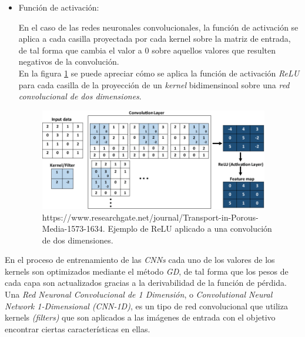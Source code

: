 \begin{itemize}
                    \item Función de activación:


                        En el caso de las redes neuronales convolucionales, la función de activación se aplica a cada casilla proyectada por cada kernel sobre la matriz de entrada, de tal forma que cambia el valor a $0$ sobre aquellos valores que resulten negativos de la convolución.\\

                        En la figura \ref{CNNRELUImage} se puede apreciar cómo se aplica la función de activación \textit{ReLU} para cada casilla de la proyección de un \textit{kernel} bidimensinoal sobre una \textit{red convolucional de dos dimensiones}.



                        \begin{figure}[h]
                            \centering
                            \includegraphics[width=10cm]{archivos/3.Tecnologias/RedesNeuronales/CNN/CNNRELUImage}
                            \caption{https://www.researchgate.net/journal/Transport-in-Porous-Media-1573-1634. Ejemplo de ReLU aplicado a una convolución de dos dimensiones.}
                            \label{CNNRELUImage}
                         \end{figure}

                \end{itemize}

                En el proceso de entrenamiento de las \textit{CNNs} cada uno de los valores de los kernels son optimizados mediante el método \textit{GD}, de tal forma que los pesos de cada capa son actualizados gracias a la derivabilidad de la función de pérdida.\\


                                
                Una \textit{Red Neuronal Convolucional de 1 Dimensión}, o \textit{Convolutional Neural Network 1-Dimensional (CNN-1D)}, es un tipo de red convolucional que utiliza kernels \textit{(filters)} que son aplicados a las imágenes de entrada con el objetivo encontrar ciertas características en ellas.\\

